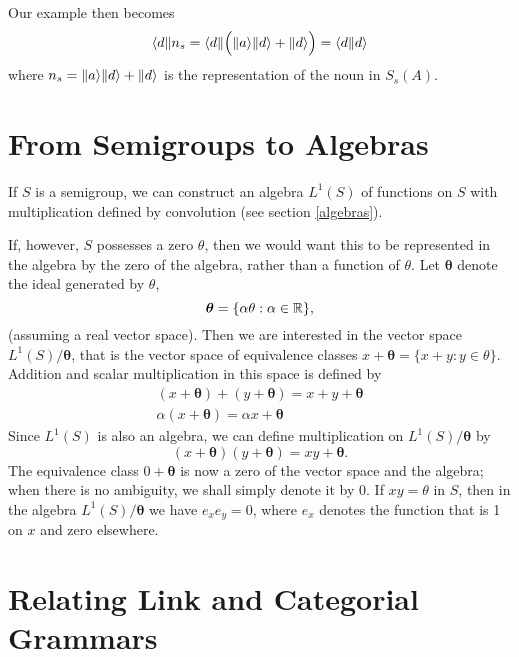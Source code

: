 \documentclass[12pt]{report}
\begin{document}
Our example then becomes
$$\langle d\|n_s = \langle d\| \Big(\|a \rangle\|d \rangle + \|d \rangle\Big) = \langle d\| d\rangle$$
where $n_s = \|a \rangle\|d \rangle + \|d \rangle$ is the representation of the noun in $S_s(A)$.

\section{From Semigroups to Algebras}

If $S$ is a semigroup, we can construct an algebra $L^1(S)$ of functions on $S$ with multiplication defined by convolution (see section \ref{algebras}).

If, however, $S$ possesses a zero $\theta$, then we would want this to be represented in the algebra by the zero of the algebra, rather than a function of $\theta$. Let $\bm{\theta}$ denote the ideal generated by $\theta$,
$$\bm{\theta} = \{\alpha\theta : \alpha \in \mathbb{R}\},$$
(assuming a real vector space). Then we are interested in the vector space $L^1(S)/\bm{\theta}$, that is the vector space of equivalence classes $x + \bm{\theta} = \{x + y: y \in \theta\}$. Addition and scalar multiplication in this space is defined by
\begin{gather*}
(x + \bm{\theta}) + (y + \bm{\theta}) = x + y + \bm{\theta}\\
\alpha(x + \bm{\theta}) = \alpha x + \bm{\theta}
\end{gather*}
Since $L^1(S)$ is also an algebra, we can define multiplication on $L^1(S)/\bm{\theta}$ by
$$(x + \bm{\theta})(y + \bm{\theta}) = xy + \bm{\theta}.$$
The equivalence class $0 + \bm{\theta}$ is now a zero of the vector space and the algebra; when there is no ambiguity, we shall simply denote it by $0$. If $xy = \theta$ in $S$, then in the algebra $L^1(S)/\bm{\theta}$ we have $e_xe_y = 0$, where $e_x$ denotes the function that is 1 on $x$ and zero elsewhere.

\section{Relating Link and Categorial Grammars}
\end{document}
